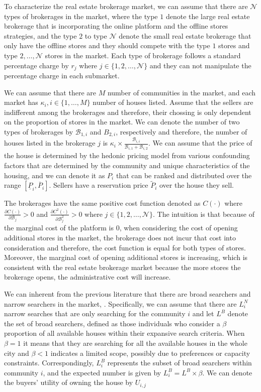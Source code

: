 To characterize the real estate brokerage market, we can assume that there are $\mathcal{N}$ types of brokerages in the market, where the type $1$ denote the large real estate brokerage that is incorporating the online platform and the offline stores strategies, and the type $2$ to type $\mathcal{N}$ denote the small real estate brokerage that only have the offline stores and they should compete with the type $1$ stores and type $2, \ldots, \mathcal{N}$ stores in the market. Each type of brokerage follows a standard percentage charge by $r_j$ where $j \in \{1, 2, \ldots, \mathcal{N}\}$ and they can not manipulate the percentage charge in each submarket.

We can assume that there are $M$ number of communities in the market, and each market has $\kappa_i, i \in \{1, \ldots, M\}$ number of houses listed. Assume that the sellers are indifferent among the brokerages and therefore, their chossing is only dependent on the proportion of stores in the market. We can denote the number of two types of brokerages by $\mathcal{B}_{1, i}$ and $B_{2, i}$, respectively and therefore, the number of houses listed in the brokerage $j$ is $\kappa_{i} \times \frac{\mathcal{B}_{i, i}}{\mathcal{B}_{i, 1} + \mathcal{B}_{i, 2}}$. We can assume that the price of the house is determined by the hedonic pricing model from various confounding factors that are determined by the community and unique characteristics of the housing, and we can denote it as $P_i$ that can be ranked and distributed over the range $[\underline{P}_i, \overline{P}_i]$. Sellers have a reservation price $\tilde{P}_i$ over the house they sell.

The brokerages have the same positive cost function denoted as $C(\cdot)$ where $\frac{\partial C(\cdot)}{\partial \mathcal{B}_{j}} > 0$ and $\frac{\partial C^2(\cdot)}{\partial \mathcal{B}_{j}^2} > 0$ where $j \in \{1, 2, \ldots, \mathcal{N}\}$. The intuition is that because of the marginal cost of the platform is $0$, when considering the cost of opening additional stores in the market, the brokerage does not incur that cost into consideration and therefore, the cost function is equal for both types of stores. Moreover, the marginal cost of opening additional stores is increasing, which is consistent with the real estate brokerage market because the more stores the brokerage opens, the administrative cost will increase.

We can inherent from the previous literature that there are broad searchers and narrow searchers in the market, \citep{10.1257/aer.20141772}. Specifically, we can assume that there are $L^N_i$ narrow searches that are only searching for the community $i$ and let $L^B$ denote the set of broad searchers, defined as those individuals who consider a $\beta$ proportion of all available houses within their expansive search criteria. When $\beta = 1$ it means that they are searching for all the available houses in the whole city and $\beta < 1$ indicates a limited scope, possibly due to preferences or capacity constraints. Correspondingly, $L^B_i$ represents the subset of broad searchers within community $i$, and the expected number is given by $L^B_i = L^B \times \beta$. We can denote the buyers' utility of owning the house by $U_{i, j}$ 


